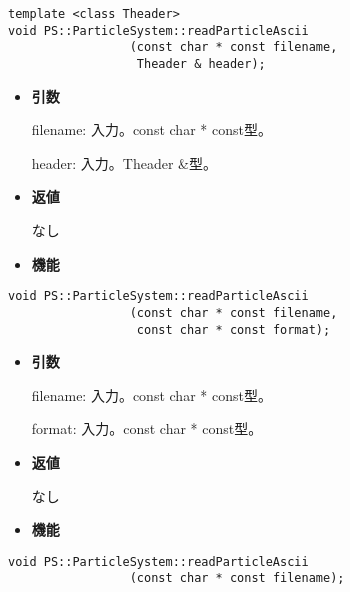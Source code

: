 \begin{screen}
\begin{verbatim}
template <class Theader>
void PS::ParticleSystem::readParticleAscii
                 (const char * const filename,
                  Theader & header);
\end{verbatim}
\end{screen}

\begin{itemize}

\item {\bf 引数}

filename: 入力。const char * const型。

header: 入力。Theader \&型。

\item {\bf 返値}

なし

\item {\bf 機能}


\end{itemize}

\begin{screen}
\begin{verbatim}
void PS::ParticleSystem::readParticleAscii
                 (const char * const filename,
                  const char * const format);
\end{verbatim}
\end{screen}

\begin{itemize}

\item {\bf 引数}

filename: 入力。const char * const型。

format: 入力。const char * const型。

\item {\bf 返値}

なし

\item {\bf 機能}


\end{itemize}

\begin{screen}
\begin{verbatim}
void PS::ParticleSystem::readParticleAscii
                 (const char * const filename);
\end{verbatim}
\end{screen}

